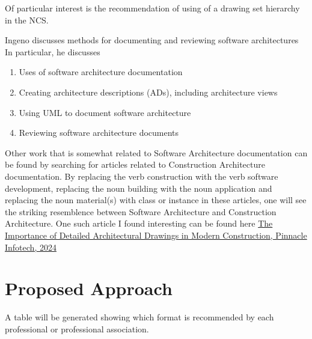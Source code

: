 \documentclass{acm_proc_article-sp}
\begin{document}
Of particular interest is the recommendation of using of a drawing set hierarchy in the NCS.  

Ingeno discusses methods for documenting and reviewing software architectures \cite{Lamport:SoftwareArchitectureHandbook} In particular, he discusses
\begin{enumerate}
	\item Uses of software architecture documentation
	\item Creating architecture descriptions (ADs), including architecture views
	\item Using UML to document software architecture
	\item Reviewing software architecture documents
\end{enumerate}

Other work that is somewhat related to Software Architecture documentation can be found by searching for articles related to Construction Architecture documentation. By replacing the verb construction with the verb software development, replacing the noun building with the noun application and replacing the noun material(s) with class or instance in these articles, one will see the striking resemblence between Software Architecture and Construction Architecture. One such article I found interesting can be found here
\href{https://pinnacleinfotech.com/importance-of-detailed-architectural-drawings-in-modern-construction/}{The Importance of Detailed Architectural Drawings in Modern Construction, Pinnacle Infotech, 2024}

\section{Proposed Approach}
A table will be generated showing which format is recommended by each professional or professional association.
\end{document}
